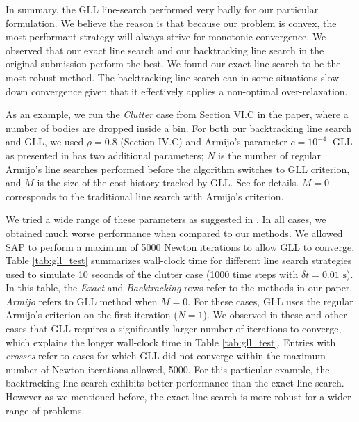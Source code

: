 In summary, the GLL line-search performed very badly for our particular
formulation. We believe the reason is that because our problem is convex, the most
performant strategy will always strive for monotonic convergence. We observed that
our exact line search and our backtracking line search in the original
submission perform the best. We found our exact line search to be the most robust
method. The backtracking line search can in some situations slow down
convergence given that it effectively applies a non-optimal over-relaxation.

As an example, we run the \emph{Clutter} case from Section VI.C in the paper,
where a number of bodies are dropped inside a bin. For both our backtracking
line search and GLL, we used $\rho=0.8$ (Section IV.C) and Armijo's parameter
$c=10^{-4}$. GLL as presented in \cite{bib:grippo1986nonmonotone} has two
additional parameters; $N$ is the number of regular Armijo's line searches
performed before the algorithm switches to GLL criterion, and $M$ is the size of the cost
history tracked by GLL. See \cite{bib:grippo1986nonmonotone} for details. $M=0$
corresponds to the traditional line search with Armijo's criterion. 

We tried a wide range of these parameters as suggested in
\cite{bib:grippo1986nonmonotone}. In all cases, we obtained much worse
performance when compared to our methods. We allowed SAP to perform a maximum of
5000 Newton iterations to allow GLL to converge. Table
\ref{tab:gll_test} summarizes wall-clock time for different line search
strategies used to simulate 10 seconds of the clutter case (1000 time steps with
$\delta t = 0.01\text{~s}$). In this table, the \emph{Exact} and
\emph{Backtracking} rows refer to the methods in our paper, \emph{Armijo} refers
to GLL method when $M=0$. For these cases, GLL uses the regular Armijo's criterion
on the first iteration ($N=1$). We observed in these and other cases that GLL
requires a significantly larger number of iterations to converge, which explains
the longer wall-clock time in Table \ref{tab:gll_test}. Entries with
\emph{crosses} refer to cases for which GLL did not converge within the maximum
number of Newton iterations allowed, 5000. For this particular example, the
backtracking line search exhibits better performance than the exact line search.
However as we mentioned before, the exact line search is more robust for a wider
range of problems.

